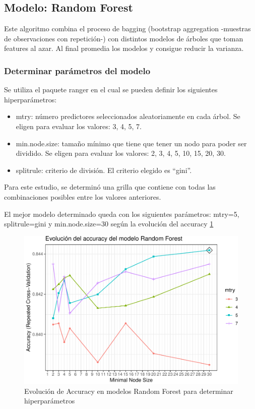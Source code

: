 \subsection{Modelo: Random Forest}

Este algoritmo combina el proceso de bagging (bootstrap aggregation
-muestras de observaciones con repetición-) con distintos modelos de
árboles que toman features al azar. Al final promedia los modelos y
consigue reducir la varianza.


\subsubsection{Determinar parámetros del modelo}

Se utiliza el paquete ranger en el cual se pueden definir los siguientes
hiperparámetros:

\begin{itemize}
	\item
	mtry: número predictores seleccionados aleatoriamente en cada árbol.
	Se eligen para evaluar los valores: 3, 4, 5, 7.
	\item
	min.node.size: tamaño mínimo que tiene que tener un nodo para poder
	ser dividido. Se eligen para evaluar los valores: 2, 3, 4, 5, 10, 15,
	20, 30.
	\item
	splitrule: criterio de división. El criterio elegido es ``gini''.
\end{itemize}

Para este estudio, se determinó una grilla que contiene con todas las
combinaciones posibles entre los valores anteriores.

El mejor modelo determinado queda con los siguientes parámetros: mtry=5,
splitrule=gini y
 min.node.size=30 según la evolución del accuracy \ref{fig:rf_hiperparam}


\begin{figure}[!htb]
	\centering
	\includegraphics{imagenes/modelos_varios/unnamed-chunk-24-1.pdf}
	\caption{Evolución de Accuracy en modelos Random Forest para determinar hiperparámetros}
	\label{fig:rf_hiperparam}
\end{figure}



